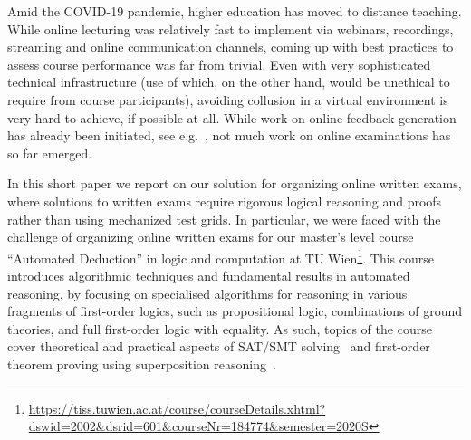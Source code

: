 Amid the COVID-19 pandemic, higher education has moved to distance
teaching. While online lecturing was relatively fast to implement via
webinars, recordings,  streaming and online communication channels,
coming up with best practices to assess course performance was far
from trivial. Even with very sophisticated technical infrastructure
(use of which, on the other hand, would be unethical to require from course
participants), avoiding collusion in a virtual
environment is very hard to achieve, if possible at all.
While work on
online feedback generation has already been initiated, see
e.g.~\cite{Zuleger18,Wang18}, 
not much work on online examinations has so far emerged. 

In this short paper we report on our solution for organizing online
written exams, where solutions to written exams require rigorous
logical reasoning and proofs rather than using mechanized test grids.
In particular, we were faced with the challenge of organizing online
written exams for our master's level course ``Automated
Deduction'' in logic and computation at TU
Wien\footnote{\url{https://tiss.tuwien.ac.at/course/courseDetails.xhtml?dswid=2002\&dsrid=601\&courseNr=184774\&semester=2020S}}.
This course introduces algorithmic techniques and fundamental results
in automated reasoning, by focusing on specialised algorithms for
reasoning in various fragments of first-order logics, such as
propositional logic, combinations of ground theories, and full
first-order logic with equality.
As such, topics of the course cover theoretical and practical
aspects of SAT/SMT solving~\cite{DPLL,Tinelli02,DPLLT} and first-order theorem proving using
superposition reasoning~\cite{Rubio01,Vampire13}.

